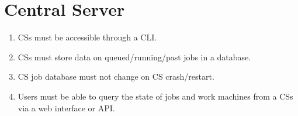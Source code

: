 \section{Central Server}
\begin{enumerate}
 \item CSs must be accessible through a CLI.
 \item CSs must store data on queued/running/past jobs in a database.
 \item CS job database must not change on CS crash/restart.
 \item Users must be able to query the state of jobs and work machines from a CSs via a web interface or API.
\end{enumerate}

